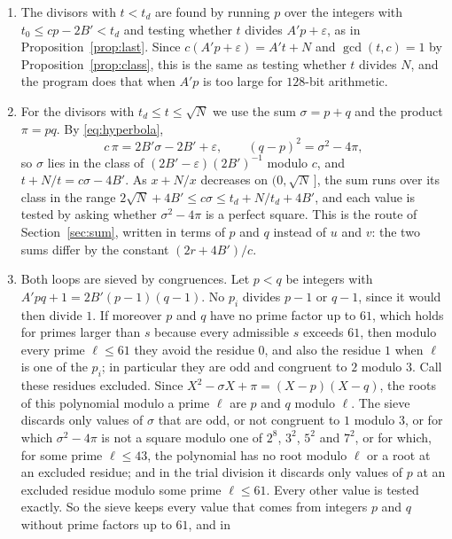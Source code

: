 \documentclass[screen,reqno]{aomart}
\numberwithin{equation}{section}
\theoremstyle{plain}
\theoremstyle{definition}
\theoremstyle{remark}
\begin{document}
\begin{enumerate}[label=\textup{(\roman*)}, leftmargin=*]
\item The divisors with $t<t_d$ are found by running $p$ over the
  integers with $t_0\le cp-2B'<t_d$ and testing whether $t$ divides
  $A'p+\varepsilon$, as in Proposition~\ref{prop:last}. Since
  $c(A'p+\varepsilon)=A't+N$ and $\gcd(t,c)=1$ by
  Proposition~\ref{prop:class}, this is the same as testing whether $t$
  divides $N$, and the program does that when $A'p$ is too large for
  $128$-bit arithmetic.
\item For the divisors with $t_d\le t\le\sqrt N$ we use the sum
  $\sigma=p+q$ and the product $\pi=pq$. By \eqref{eq:hyperbola},
  \begin{equation}\label{eq:sigma}
    c\,\pi=2B'\sigma-2B'+\varepsilon,\qquad
    (q-p)^2=\sigma^2-4\pi ,
  \end{equation}
  so $\sigma$ lies in the class of $(2B'-\varepsilon)(2B')^{-1}$ modulo
  $c$, and $t+N/t=c\sigma-4B'$. As $x+N/x$ decreases on
  $(0,\sqrt N\,]$, the sum runs over its class in the range
  $2\sqrt N+4B'\le c\sigma\le t_d+N/t_d+4B'$, and each value is
  tested by asking whether $\sigma^2-4\pi$ is a perfect square. This
  is the route of Section~\ref{sec:sum}, written in terms of $p$ and
  $q$ instead of $u$ and $v$: the two sums differ by the constant
  $(2r+4B')/c$.
\item Both loops are sieved by congruences. Let $p<q$ be integers
  with $A'pq+1=2B'(p-1)(q-1)$. No $p_i$ divides $p-1$ or $q-1$, since
  it would then divide $1$. If moreover $p$ and $q$ have no prime
  factor up to $61$, which holds for primes larger than $s$ because
  every admissible $s$ exceeds $61$, then modulo every prime $\ell\le61$
  they avoid the residue $0$, and also the residue $1$ when $\ell$ is
  one of the $p_i$; in particular they are odd and congruent to $2$
  modulo $3$. Call these residues excluded. Since
  $X^2-\sigma X+\pi=(X-p)(X-q)$, the roots of this polynomial modulo a
  prime $\ell$ are $p$ and $q$ modulo $\ell$. The sieve discards only
  values of $\sigma$ that are odd, or not congruent to $1$ modulo $3$,
  or for which $\sigma^2-4\pi$ is not a square modulo one of $2^8$,
  $3^2$, $5^2$ and $7^2$, or for which, for some prime $\ell\le43$,
  the polynomial has no root modulo $\ell$ or a root at an excluded
  residue; and in the trial division it discards only values of $p$
  at an excluded residue modulo some prime $\ell\le61$. Every other
  value is tested exactly. So the sieve keeps every value that comes
  from integers $p$ and $q$ without prime factors up to $61$, and in

\end{enumerate}
\end{document}

